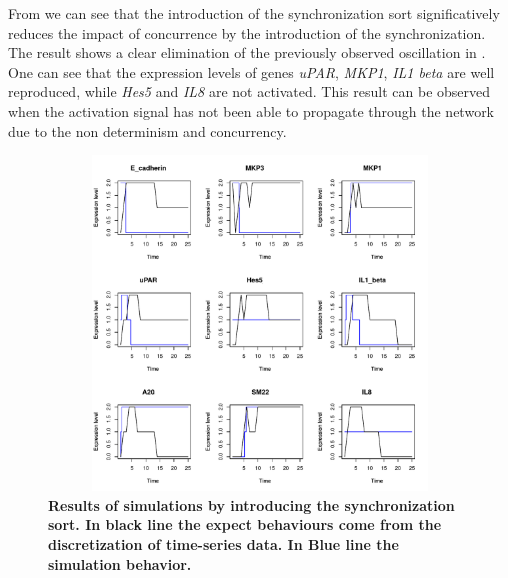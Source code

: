 From  we can see that the introduction of the synchronization sort significatively reduces the 
impact of concurrence by the introduction of the synchronization. The result shows  a 
clear elimination of the previously observed oscillation in . One can see that the expression levels of genes \emph{uPAR}, \emph{MKP1},
\emph{IL1 beta} are well reproduced, while \emph{Hes5} and \emph{IL8} are not activated. This result can be observed when the activation
signal has not been able to propagate through the network due to the non determinism  and concurrency.


\begin{figure}[!t]
\centering
\includegraphics[width=6.5in,height=3.5in]{images/resultWS.pdf}
\caption{\bf Results of simulations by introducing the synchronization sort. In black line the expect behaviours
come from the discretization of time-series data. In Blue line the simulation behavior.}
\label{fig:rws}
\end{figure}



%
%

